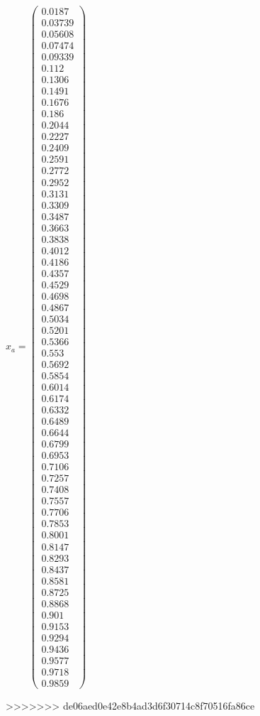 \documentclass{udpreport}
\begin{document}
\begin{enumerate}
\begin{enumerate}
\begin{itemize}
\begin{itemize}
					$x_{a} = \left(\begin{array}{c} 0.0187\\ 0.03739\\ 0.05608\\ 0.07474\\ 0.09339\\ 0.112\\ 0.1306\\ 0.1491\\ 0.1676\\ 0.186\\ 0.2044\\ 0.2227\\ 0.2409\\ 0.2591\\ 0.2772\\ 0.2952\\ 0.3131\\ 0.3309\\ 0.3487\\ 0.3663\\ 0.3838\\ 0.4012\\ 0.4186\\ 0.4357\\ 0.4529\\ 0.4698\\ 0.4867\\ 0.5034\\ 0.5201\\ 0.5366\\ 0.553\\ 0.5692\\ 0.5854\\ 0.6014\\ 0.6174\\ 0.6332\\ 0.6489\\ 0.6644\\ 0.6799\\ 0.6953\\ 0.7106\\ 0.7257\\ 0.7408\\ 0.7557\\ 0.7706\\ 0.7853\\ 0.8001\\ 0.8147\\ 0.8293\\ 0.8437\\ 0.8581\\ 0.8725\\ 0.8868\\ 0.901\\ 0.9153\\ 0.9294\\ 0.9436\\ 0.9577\\ 0.9718\\ 0.9859 \end{array}\right)$
				\end{itemize}
			\end{itemize}
		\end{enumerate}
>>>>>>> de06aed0e42e8b4ad3d6f30714c8f70516fa86ce
 	

\end{enumerate}
\end{document}
